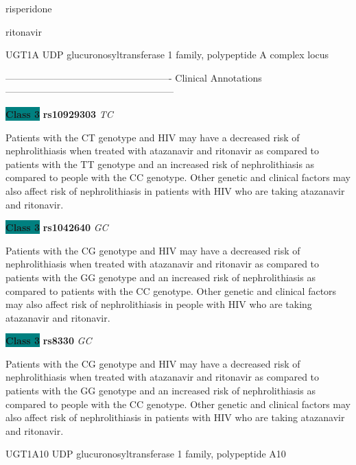 \documentclass{resume} %
\begin{document}
\begin{rSection}{ risperidone }
\end{rSection}\begin{rSection}{ ritonavir }
\item[]

\begin{rSubsection}{ UGT1A }{ UDP glucuronosyltransferase 1 family, polypeptide A complex locus }{}{}
\item[]

\item[] ---------------------------------------------------- Clinical Annotations -----------------------------------------------------\newline
\item \textbf{\colorbox{teal} {Class 3}} \textbf{ rs10929303 } \textit{ TC }
\item[] Patients with the CT genotype and HIV may have a decreased risk of nephrolithiasis when treated with atazanavir and ritonavir as compared to patients with the TT genotype and an increased risk of nephrolithiasis as compared to people with the CC genotype. Other genetic and clinical factors may also affect risk of nephrolithiasis in patients with HIV who are taking atazanavir and ritonavir. \item \textbf{\colorbox{teal} {Class 3}} \textbf{ rs1042640 } \textit{ GC }
\item[] Patients with the CG genotype and HIV may have a decreased risk of nephrolithiasis when treated with atazanavir and ritonavir as compared to patients with the GG genotype and an increased risk of nephrolithiasis as compared to patients with the CC genotype. Other genetic and clinical factors may also affect risk of nephrolithiasis in people with HIV who are taking atazanavir and ritonavir.\item \textbf{\colorbox{teal} {Class 3}} \textbf{ rs8330 } \textit{ GC }
\item[] Patients with the CG genotype and HIV may have a decreased risk of nephrolithiasis when treated with atazanavir and ritonavir as compared to patients with the GG genotype and an increased risk of nephrolithiasis as compared to people with the CC genotype. Other genetic and clinical factors may also affect risk of nephrolithiasis in patients with HIV who are taking atazanavir and ritonavir.
\end{rSubsection}\begin{rSubsection}{ UGT1A10 }{ UDP glucuronosyltransferase 1 family, polypeptide A10 }{}{}
\item[]


\end{rSubsection}
\end{rSection}
\end{document}
